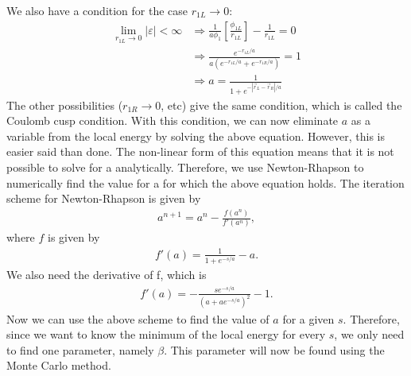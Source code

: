 We also have a condition for the case $r_{1L}\rightarrow0$:
\begin{align}
\mathop {\lim }\limits_{{r_{1L}} \to 0} \left| \varepsilon  \right| < \infty  &\Rightarrow \frac{1}{{a{\phi _1}}}\left[ {\frac{{{\phi _{1L}}}}{{{r_{1L}}}}} \right] - \frac{1}{{{r_{1L}}}} = 0\nonumber\\& \Rightarrow \frac{{{e^{ - {r_{1L}}/a}}}}{{a\left( {{e^{ - {r_{1L}}/a}} + {e^{ - {r_{1R}}/a}}} \right)}} = 1\nonumber\\&
 \Rightarrow a = \frac{1}{{1 + {e^{ - \left| {{{\vec r}_L} - {{\vec r}_R}} \right|/a}}}}
\end{align}
The other possibilities ($r_{1R}\rightarrow0$, etc) give the same condition, which is called the Coulomb cusp condition. With this condition, we can now eliminate $a$ as a variable from the local energy by solving the above equation.
However, this is easier said than done. The non-linear form of this equation means that it is not possible to solve for a analytically. Therefore, we use Newton-Rhapson to numerically find the value for a for which the above equation holds.
\noindent The iteration scheme for Newton-Rhapson is given by
\begin{align}
{a^{n + 1}} = {a^n} - \frac{{f\left( {{a^n}} \right)}}{{f'\left( {{a^n}} \right)}},
\end{align}
where $f$ is given by
\begin{align}
f'\left( a \right) = \frac{1}{{1 + {e^{ - s/a}}}} - a.
\end{align}
We also need the derivative of f, which is
\begin{align}
f'\left( a \right) =  - \frac{{s{e^{ - s/a}}}}{{{{\left( {a + a{e^{ - s/a}}} \right)}^2}}} - 1.
\end{align}
Now we can use the above scheme to find the value of $a$ for a given $s$. Therefore, since we want to know the minimum of the local energy for every $s$, we only need to find one parameter, namely $\beta$. This parameter will now be found using the Monte Carlo method. 
